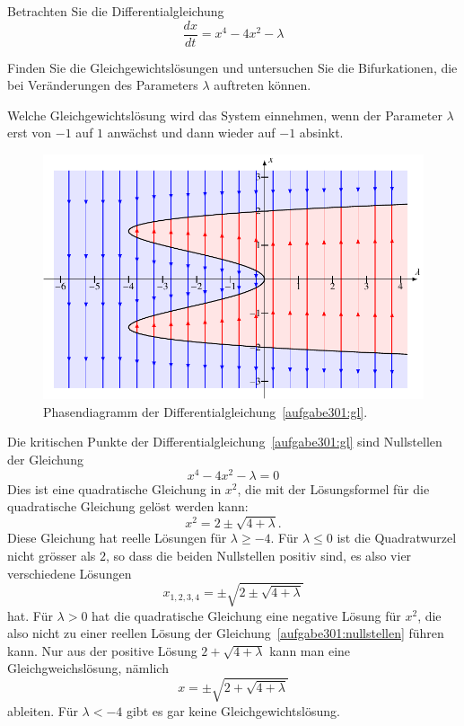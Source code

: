 Betrachten Sie die Differentialgleichung
\begin{equation}
\frac{dx}{dt}
=
x^4-4x^2-\lambda
\label{aufgabe301:gl}
\end{equation}
\begin{teilaufgaben}
\item
Finden Sie die Gleichgewichtslösungen und untersuchen Sie die 
Bifurkationen, die bei Veränderungen des Parameters $\lambda$
auftreten können.
\item
Welche Gleichgewichtslösung wird das System einnehmen, wenn der
Parameter $\lambda$ erst von $-1$ auf $1$ anwächst
und dann wieder auf $-1$ absinkt.
\end{teilaufgaben}

\begin{loesung}
\begin{figure}
\centering
\includegraphics{chapters/3/grad4.pdf}
\caption{Phasendiagramm der Differentialgleichung~\eqref{aufgabe301:gl}.
\label{aufgabe301:fig}}
\end{figure}
\begin{teilaufgaben}
\item
Die kritischen Punkte der Differentialgleichung~\eqref{aufgabe301:gl}
sind Nullstellen der Gleichung
\begin{equation}
x^4-4x^2-\lambda=0
\label{aufgabe301:nullstellen}
\end{equation}
Dies ist eine quadratische Gleichung in $x^2$, die mit der Lösungsformel
für die quadratische Gleichung gelöst werden kann:
\[
x^2 = 2 \pm \sqrt{4+\lambda}.
\]
Diese Gleichung hat reelle Lösungen für $\lambda \ge -4$.
Für $\lambda \le 0$ ist die Quadratwurzel nicht grösser als $2$,
so dass die beiden Nullstellen positiv sind, es also vier verschiedene
Lösungen
\begin{equation}
x_{1,2,3,4} = \pm\sqrt{2\pm\sqrt{4+\lambda}}
\end{equation}
hat.
Für $\lambda >0$ hat die quadratische Gleichung eine negative Lösung
für $x^2$, die also nicht zu einer reellen Lösung der
Gleichung~\eqref{aufgabe301:nullstellen} führen kann.
Nur aus der positive Lösung $2+\sqrt{4+\lambda}$ kann man eine
Gleichgweichslösung, nämlich
\[
x=\pm\sqrt{2+\sqrt{4+\lambda}}
\]
ableiten.
Für $\lambda < -4$ gibt es gar keine Gleichgewichtslösung.


\end{teilaufgaben}
\end{loesung}
